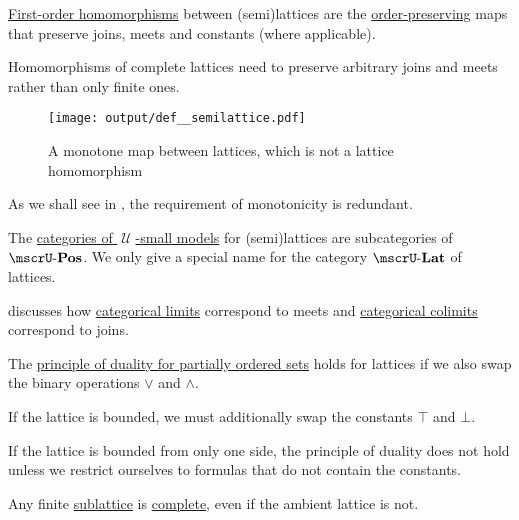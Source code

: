 \begin{definition}
\begin{thmenum}[resume=def:semilattice]
     \hyperref[def:first_order_homomorphism]{First-order homomorphisms} between (semi)lattices are the \hyperref[def:order_homomorphism/increasing]{order-preserving} maps that preserve joins, meets and constants (where applicable).

    Homomorphisms of complete lattices need to preserve arbitrary joins and meets rather than only finite ones.

    \begin{figure}[!ht]
      \centering
      \texttt{[image: output/def\_\_semilattice.pdf]}
      \caption{A monotone map between lattices, which is not a lattice homomorphism}
      \label{fig:def:semilattice/homomorphism/monotone_map_not_homomorphism}
    \end{figure}

    As we shall see in , the requirement of monotonicity is redundant.

     The \hyperref[def:category_of_small_first_order_models]{categories of \( \mscrU \)-small models} for (semi)lattices are subcategories of \hyperref[def:partially_ordered_set]{\( \ucat{Pos} \)}. We only give a special name for the category \( \ucat{Lat} \) of lattices.

     discusses how \hyperref[def:category_of_cones/limit]{categorical limits} correspond to meets and \hyperref[def:category_of_cones/colimit]{categorical colimits} correspond to joins.

     The \hyperref[thm:preorder_duality]{principle of duality for partially ordered sets} holds for lattices if we also swap the binary operations \( \vee \) and \( \wedge \).

    If the lattice is bounded, we must additionally swap the constants \( \top \) and \( \bot \).

    If the lattice is bounded from only one side, the principle of duality does not hold unless we restrict ourselves to formulas that do not contain the constants.
  \end{thmenum}
\end{definition}

\begin{example}\label{ex:complete_sublattice_of_incomplete_lattice}
  Any finite \hyperref[def:semilattice/submodel]{sublattice} is \hyperref[def:semilattice/complete]{complete}, even if the ambient lattice is not.
\end{example}

